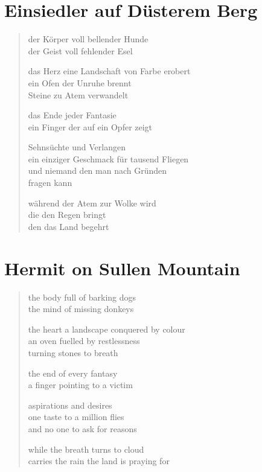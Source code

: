 
\cleartoverso

\section{Einsiedler auf Düsterem Berg}

\begin{verse}

der Körper voll bellender Hunde\\
der Geist voll fehlender Esel

das Herz eine Landschaft von Farbe erobert\\
ein Ofen der Unruhe brennt\\
Steine zu Atem verwandelt

das Ende jeder Fantasie\\
ein Finger der auf ein Opfer zeigt

Sehnsüchte und Verlangen\\
ein einziger Geschmack für tausend Fliegen\\
und niemand den man nach Gründen\\
fragen kann

während der Atem zur Wolke wird\\
die den Regen bringt\\
den das Land begehrt

\end{verse}

\clearpage

\section{Hermit on Sullen Mountain}

\begin{verse}

the body full of barking dogs\\
the mind of missing donkeys

the heart a landscape conquered by colour\\
an oven fuelled by restlessness\\
turning stones to breath

the end of every fantasy\\
a finger pointing to a victim

aspirations and desires\\
one taste to a million flies\\
and no one to ask for reasons

while the breath turns to cloud\\
carries the rain the land is praying for

\end{verse}


